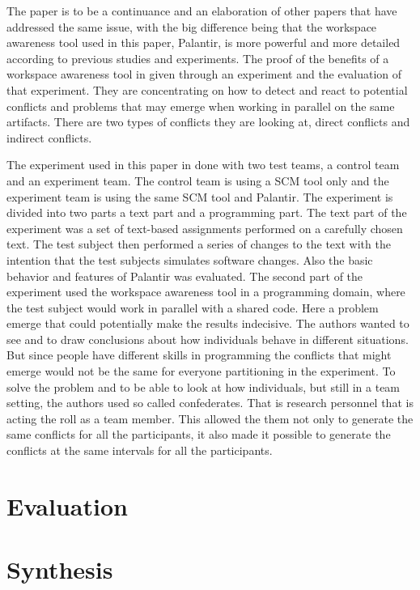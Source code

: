 \documentclass[a4paper]{article}
\begin{document}
The paper is to be a continuance and an elaboration of other papers that have addressed the same issue, with the big difference being that the workspace awareness tool used in this paper, Palantir,  is more powerful and more detailed according to previous studies and experiments.
The proof of the benefits of a workspace awareness tool in given through an experiment and the evaluation of that experiment. They are concentrating on how to detect and react to potential conflicts and problems that may emerge when working in parallel on the same artifacts. There are two types of conflicts they are looking at, direct conflicts and indirect conflicts. \begin{comment}Direct conflicts is when two people is working on the same artifact on different workspaces and their changes to the file needs to be merged to create a combined result. Indirect conflict is for example when person A is changing a file that person B uses as an import in another file. When person A commits and person B updates, person B's file does not work anymore because of the changes made in the imported file that person A was working on.\end{comment}
The experiment used in this paper in done with two test teams, a control team and an experiment team. The control team is using a SCM tool only and the experiment team is using the same SCM tool and Palantir. The experiment is divided into two parts a text part and a programming part. The text part of the experiment was a set of text-based assignments performed on a carefully chosen text. The test subject then performed a series of changes to the text with the intention that the test subjects simulates software changes. Also the basic behavior and features of Palantir was evaluated. The second part of the experiment used the workspace awareness tool in a programming domain, where the test subject would work in parallel with a shared code. Here a problem emerge that could potentially make the results indecisive. The authors wanted to see and to draw conclusions about how individuals behave in different situations. But since people have different skills in programming the conflicts that might emerge would not be the same for everyone partitioning in the experiment. To solve the problem and to be able to look at how individuals, but still in a team setting, the authors used so called confederates. That is research personnel that is acting the roll as a team member. This allowed the them not only to generate the same conflicts for all the participants, it also made it possible to generate the conflicts at the same intervals for all the participants. 
\section*{Evaluation}



\section*{Synthesis}
\end{document}
